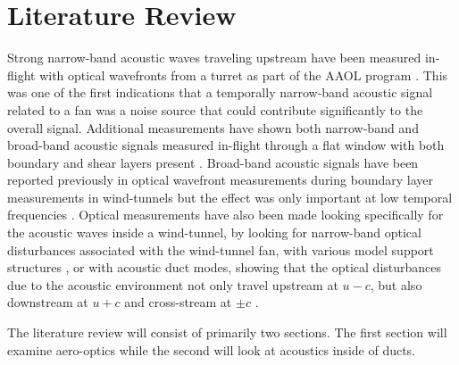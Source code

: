 
\chapter{Literature Review}
\label{chap:02_lit_review}

Strong narrow-band acoustic waves traveling upstream have been measured in-flight with optical wavefronts from a turret as part of the AAOL program \cite{DeLucca-2018-gBQdjTmT}.
This was one of the first indications that a temporally narrow-band acoustic signal related to a fan was a noise source that could contribute significantly to the overall signal.
Additional measurements have shown both narrow-band and broad-band acoustic signals measured in-flight through a flat window with both boundary and shear layers present \cite{Gordeyev-2020-6HnfJMnC}.
Broad-band acoustic signals have been reported previously in optical wavefront measurements during boundary layer measurements in wind-tunnels but the effect was only  important at low temporal frequencies \cite{Gordeyev-2014-jcJndkHM,Smith-2013-VXArwwux}.
Optical measurements have also been made looking specifically for the acoustic waves inside a wind-tunnel, by looking for narrow-band optical disturbances associated with the wind-tunnel fan, with various model support structures \cite{Catron-2018-DdVp6VZf}, or with acoustic duct modes, showing that the optical disturbances due to the acoustic environment not only travel upstream at $u-c$, but also downstream at $u+c$ and cross-stream at $\pm c$ \cite{Catron-2020-x8njYmmu}.

The literature review will consist of primarily two sections.
The first section will examine aero-optics while the second will look at acoustics inside of ducts.

